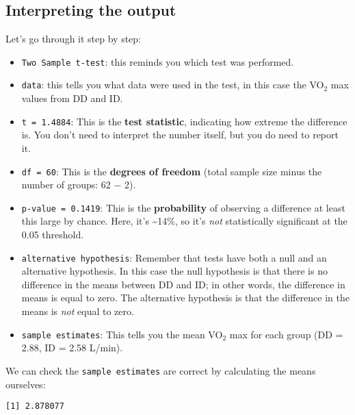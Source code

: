 \documentclass[
  letterpaper,
  DIV=11,
  numbers=noendperiod]{scrartcl}
\newenvironment{Shaded}{\begin{snugshade}}{\end{snugshade}}
\newcommand{\AttributeTok}[1]{\textcolor[rgb]{0.40,0.45,0.13}{#1}}
\newcommand{\FunctionTok}[1]{\textcolor[rgb]{0.28,0.35,0.67}{#1}}
\newcommand{\NormalTok}[1]{\textcolor[rgb]{0.00,0.23,0.31}{#1}}
\newcommand{\SpecialCharTok}[1]{\textcolor[rgb]{0.37,0.37,0.37}{#1}}
\begin{document}
\subsection{Interpreting the output}\label{interpreting-the-output}

Let's go through it step by step:

\begin{itemize}
\item
  \texttt{Two\ Sample\ t-test}: this reminds you which test was
  performed.
\item
  \texttt{data}: this tells you what data were used in the test, in this
  case the VO\(_2\) max values from DD and ID.
\item
  \texttt{t\ =\ 1.4884}: This is the \textbf{test statistic}, indicating
  how extreme the difference is. You don't need to interpret the number
  itself, but you do need to report it.
\item
  \texttt{df\ =\ 60}: This is the \textbf{degrees of freedom} (total
  sample size minus the number of groups: 62 − 2).
\item
  \texttt{p-value\ =\ 0.1419}: This is the \textbf{probability} of
  observing a difference at least this large by chance. Here, it's
  \textasciitilde14\%, so it's \emph{not} statistically significant at
  the 0.05 threshold.
\item
  \texttt{alternative\ hypothesis}: Remember that tests have both a null
  and an alternative hypothesis. In this case the null hypothesis is
  that there is no difference in the means between DD and ID; in other
  words, the difference in means is equal to zero. The alternative
  hypothesis is that the difference in the means is \emph{not} equal to
  zero.
\item
  \texttt{sample\ estimates}: This tells you the mean VO\(_2\) max for
  each group (DD = 2.88, ID = 2.58 L/min).
\end{itemize}

We can check the \texttt{sample\ estimates} are correct by calculating
the means ourselves:

\begin{Shaded}
\end{Shaded}

\begin{verbatim}
[1] 2.878077
\end{verbatim}
\end{document}
